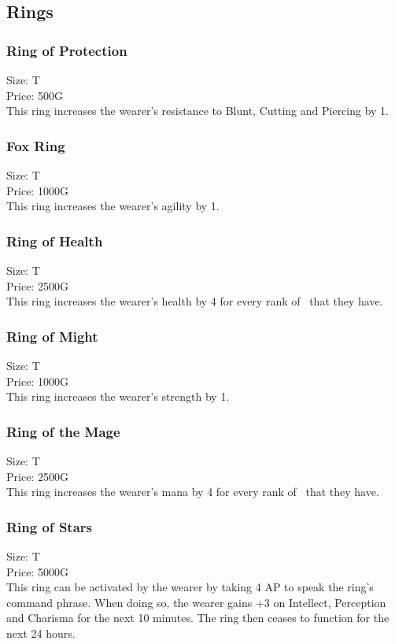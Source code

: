 \subsection{Rings}\label{subsec:rings}

\subsubsection{Ring of Protection}\label{item:ringOfProtection}
Size: T\\
Price: 500G\\
This ring increases the wearer's resistance to Blunt, Cutting and Piercing by 1.

\subsubsection{Fox Ring}\label{item:ringOfFox}
Size: T\\
Price: 1000G\\
This ring increases the wearer's agility by 1.

\subsubsection{Ring of Health}\label{item:ringOfHealth}
Size: T\\
Price: 2500G\\
This ring increases the wearer's health by 4 for every rank of~ that they have.

\subsubsection{Ring of Might}\label{item:ringOfMight}
Size: T\\
Price: 1000G\\
This ring increases the wearer's strength by 1.

\subsubsection{Ring of the Mage}\label{item:ringOfMage}
Size: T\\
Price: 2500G\\
This ring increases the wearer's mana by 4 for every rank of~ that they have.

\subsubsection{Ring of Stars}\label{item:ringOfStars}
Size: T\\
Price: 5000G\\
This ring can be activated by the wearer by taking 4 AP to speak the ring's command phrase.
When doing so, the wearer gains +3 on Intellect, Perception and Charisma for the next 10 minutes.
The ring then ceases to function for the next 24 hours.